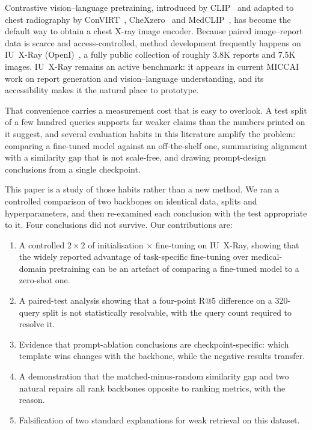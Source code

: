 \documentclass[runningheads]{llncs}
\begin{document}
Contrastive vision--language pretraining, introduced by CLIP~\cite{radford2021clip}
and adapted to chest radiography by ConVIRT~\cite{zhang2020convirt},
CheXzero~\cite{tiu2022chexzero} and MedCLIP~\cite{wang2022medclip}, has become the
default way to obtain a chest X-ray image encoder. Because paired image--report
data is scarce and access-controlled, method development frequently happens on
IU~X-Ray (OpenI)~\cite{demner2016openi}, a fully public collection of roughly
3.8K reports and 7.5K images. IU~X-Ray remains an active benchmark: it appears in
current MICCAI work on report generation and vision--language understanding, and
its accessibility makes it the natural place to prototype.

That convenience carries a measurement cost that is easy to overlook. A test
split of a few hundred queries supports far weaker claims than the numbers
printed on it suggest, and several evaluation habits in this literature amplify
the problem: comparing a fine-tuned model against an off-the-shelf one,
summarising alignment with a similarity gap that is not scale-free, and drawing
prompt-design conclusions from a single checkpoint.

This paper is a study of those habits rather than a new method. We ran a
controlled comparison of two backbones on identical data, splits and
hyperparameters, and then re-examined each conclusion with the test appropriate
to it. Four conclusions did not survive. Our contributions are:

\begin{enumerate}
\item A controlled $2\times2$ of initialisation $\times$ fine-tuning on
IU~X-Ray, showing that the widely reported advantage of task-specific
fine-tuning over medical-domain pretraining can be an artefact of comparing a
fine-tuned model to a zero-shot one.
\item A paired-test analysis showing that a four-point R@5 difference on a
320-query split is not statistically resolvable, with the query count required to
resolve it.
\item Evidence that prompt-ablation conclusions are checkpoint-specific: which
template wins changes with the backbone, while the negative results transfer.
\item A demonstration that the matched-minus-random similarity gap and two
natural repairs all rank backbones opposite to ranking metrics, with the reason.
\item Falsification of two standard explanations for weak retrieval on this
dataset.
\end{enumerate}
\end{document}
